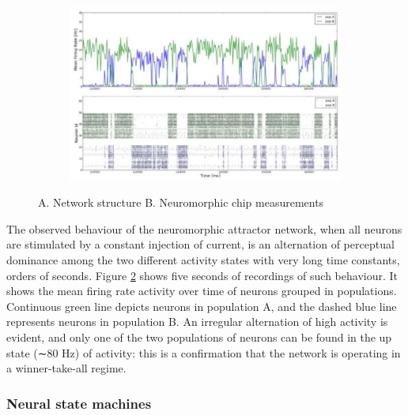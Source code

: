 \documentclass[main]{subfiles}
\begin{document}
\begin{figure}
\begin{subfigure}[b]{0.47\textwidth}
        \includegraphics[width=\textwidth]{12_NeuromorphicSystems2/figures/bista2.PNG}
        \caption{}
        \label{fig:cpg1}
     \end{subfigure}
        \caption{A. Network structure B. Neuromorphic chip measurements}
        \label{fig:bista}
\end{figure}
%

The observed behaviour of the neuromorphic attractor network, when all neurons are stimulated by a constant injection of current, is an alternation of perceptual dominance among the two different activity states with very long time constants,  orders of seconds.  Figure \ref{fig:bista} shows five seconds of recordings of such behaviour. It shows the mean firing rate activity over time of neurons grouped in populations. Continuous green line depicts neurons in population A, and the dashed blue line represents neurons in population B. An irregular alternation of high activity is evident, and only one of the two populations of neurons can be found in the up state (∼80 Hz) of activity: this is a confirmation that the network is operating in a winner-take-all regime.
\subsubsection{Neural state machines}
\end{document}
